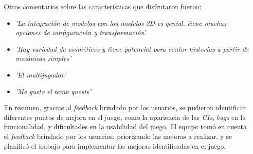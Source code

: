 Otros comentarios sobre las características que disfrutaron fueron:

\begin{itemize}
    \item \textit{'La integración de modelos con los modelos 3D es genial, tiene muchas opciones de configuración y transformación'}
    \item \textit{'Hay variedad de cosméticos y tiene potencial para contar historias a partir de mecánicas simples'}
    \item \textit{'El multijugador'}
    \item \textit{'Me gusto el tema quests'}
\end{itemize}

En resumen, gracias al \textit{feedback} brindado por los usuarios, se pudieron identificar diferentes puntos de mejora en el juego, 
como la apariencia de las \textit{UIs}, \textit{bugs} en la funcionalidad, y dificultades en la usabilidad del juego. 
El equipo tomó en cuenta el \textit{feedback} brindado por los usuarios, priorizando las mejoras a realizar, y se planificó 
el trabajo para implementar las mejoras identificadas en el juego.
